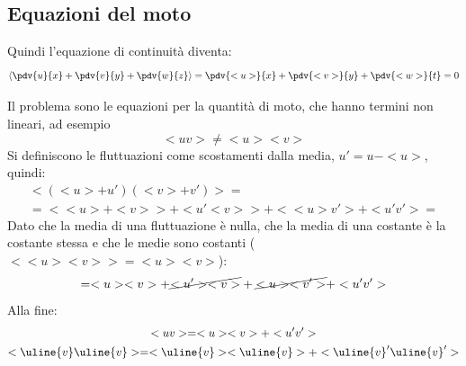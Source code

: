 \subsection{Equazioni del moto}
Quindi l'equazione di continuità diventa:
%
	\begin{equation*}
		\left< \pdv{u}{x} + \pdv{v}{y} + \pdv{w}{z} \right> = \pdv{<u>}{x} + \pdv{<v>}{y} + \pdv{<w>}{t} = 0
	\end{equation*}
%

Il problema sono le equazioni per la quantità di moto, che hanno termini non lineari, ad esempio
%
	\begin{equation*}
		<uv> \neq <u> <v>
	\end{equation*}
%
Si definiscono le fluttuazioni come scostamenti dalla media, $u' = u - <u>$, quindi:
%
	\begin{equation*}
		\begin{gathered}
			<(<u> + u') (<v> + v') > = \\
			= <<u> + <v>> + <u' <v> > + < <u> v' > + < u' v' > =
		\end{gathered}
	\end{equation*}
%
Dato che la media di una fluttuazione è nulla, che la media di una costante è la costante stessa e che le medie sono costanti ($< <u> <v>  > = < u > < v >$):
%
	\begin{equation*}
		= <u> <v> + \cancel{<u'> <v>} + \cancel{<u> <v'>} + <u' v'>
	\end{equation*}
%
Alla fine:
%
	\begin{equation*}
		\begin{gathered}
			<uv> = <u> <v> + <u' v'>\\
			<\uline{v} \uline{v}> = <\uline{v}> <\uline{v}> + <\uline{v}' \uline{v}'>
		\end{gathered}
	\end{equation*}
%

